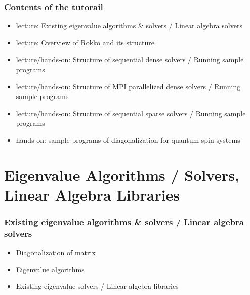 \begin{frame}
  \frametitle{Contents of the tutorail}
  \begin{itemize}
  \item lecture: Existing eigenvalue algorithms \& solvers / Linear algebra solvers
  \item lecture: Overview of Rokko and its structure
  \item lecture/hands-on: Structure of sequential dense solvers / Running sample programs
  \item lecture/hands-on: Structure of MPI parallelized dense solvers / Running sample programs
  \item lecture/hands-on: Structure of sequential sparse solvers / Running sample programs
  \item hands-on: sample programs of diagonalization for quantum spin systems
  \end{itemize}
\end{frame}


\section{Eigenvalue Algorithms / Solvers, Linear Algebra Libraries}

\begin{frame}
  \frametitle{Existing eigenvalue algorithms \& solvers / Linear algebra solvers}
  \begin{itemize}
    \setlength{\itemsep}{1em}
  \item Diagonalization of matrix
  \item Eigenvalue algorithms
  \item Existing eigenvalue solvers / Linear algebra libraries
  \end{itemize}
\end{frame}

